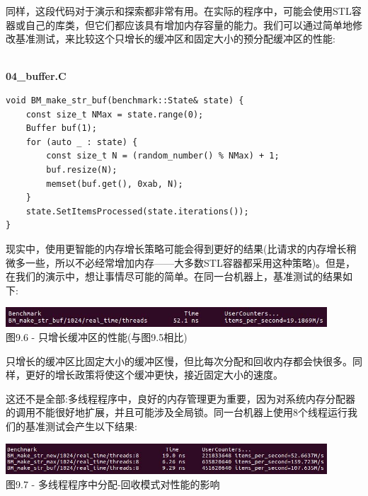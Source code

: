同样，这段代码对于演示和探索都非常有用。在实际的程序中，可能会使用STL容器或自己的库类，但它们都应该具有增加内存容量的能力。我们可以通过简单地修改基准测试，来比较这个只增长的缓冲区和固定大小的预分配缓冲区的性能:

\hspace*{\fill} \\ %
\noindent
\textbf{04\_buffer.C}
\begin{lstlisting}[style=styleCXX]
void BM_make_str_buf(benchmark::State& state) {
	const size_t NMax = state.range(0);
	Buffer buf(1);
	for (auto _ : state) {
		const size_t N = (random_number() % NMax) + 1;     
		buf.resize(N);
		memset(buf.get(), 0xab, N);
	}
	state.SetItemsProcessed(state.iterations());
}
\end{lstlisting}

现实中，使用更智能的内存增长策略可能会得到更好的结果(比请求的内存增长稍微多一些，所以不必经常增加内存——大多数STL容器都采用这种策略)。但是，在我们的演示中，想让事情尽可能的简单。在同一台机器上，基准测试的结果如下:

\begin{center}
\includegraphics[width=0.9\textwidth]{content/3/chapter9/images/6.jpg}\\
图9.6 - 只增长缓冲区的性能(与图9.5相比)
\end{center}

只增长的缓冲区比固定大小的缓冲区慢，但比每次分配和回收内存都会快很多。同样，更好的增长政策将使这个缓冲更快，接近固定大小的速度。 

这还不是全部:多线程程序中，良好的内存管理更为重要，因为对系统内存分配器的调用不能很好地扩展，并且可能涉及全局锁。同一台机器上使用8个线程运行我们的基准测试会产生以下结果:

\begin{center}
\includegraphics[width=0.9\textwidth]{content/3/chapter9/images/7.jpg}\\
图9.7 - 多线程程序中分配-回收模式对性能的影响
\end{center}

